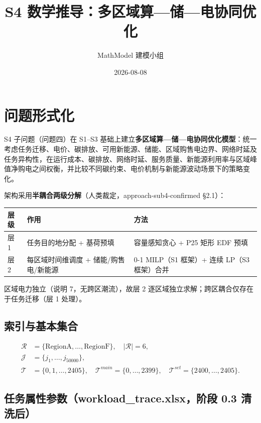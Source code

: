 \documentclass{internal-report}
\title{S4 数学推导：多区域算—储—电协同优化}
\author{MathModel 建模小组}
\date{2026-08-08}
\begin{document}
\maketitle

\section{问题形式化}

S4 子问题（问题四）在 S1--S3 基础上建立\textbf{多区域算—储—电协同优化模型}：统一考虑任务迁移、电价、碳排放、可用新能源、储能、区域购售电边界、网络时延及任务异构性，在运行成本、碳排放、网络时延、服务质量、新能源利用率与区域峰值净购电之间权衡，并比较不同碳约束、电价机制与新能源波动场景下的策略变化。

架构采用\textbf{半耦合两级分解}（人类裁定，approach-sub4-confirmed §2.1）：

\begin{center}
\footnotesize
\begin{tabular}{lll}
\toprule
层级 & 作用 & 方法 \\
\midrule
层 1 & 任务目的地分配 + 基荷预填 & 容量感知贪心 + P25 矩形 EDF 预填 \\
层 2 & 每区域时间维调度 + 储能/购售电/新能源 & 0-1 MILP（S1 框架）+ 连续 LP（S3 框架）合并 \\
\bottomrule
\end{tabular}
\end{center}

区域电力独立（说明 7，无跨区潮流），故层 2 逐区域独立求解；跨区耦合仅存在于任务迁移（层 1 处理）。

\subsection{索引与基本集合}

\begin{align}
  \mathcal{R} &= \{\text{RegionA},\ldots,\text{RegionF}\},\quad |\mathcal{R}|=6, \label{eq:regions}\\
  \mathcal{J} &= \{j_1,\ldots,j_{50000}\},\\
  \mathcal{T} &= \{0,1,\ldots,2405\},\quad \mathcal{T}^{main}=\{0,\ldots,2399\},\quad
  \mathcal{T}^{set}=\{2400,\ldots,2405\}.
\end{align}

\subsection{任务属性参数（workload\_trace.xlsx，阶段 0.3 清洗后）}
\end{document}
